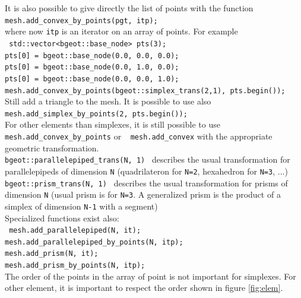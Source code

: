 \documentclass[11pt,a4paper]{article}
\begin{document}
It is also possible to give directly the list of points with the function\\[0.5cm]
{\tt mesh.add\_convex\_by\_points(pgt, itp); }\\[0.5cm]
where now {\tt itp} is an iterator on an array of points. For example\\[0.5cm]
{\tt
  std::vector<bgeot::base\_node> pts(3); \\
  pts[0] = bgeot::base\_node(0.0, 0.0, 0.0); \\
  pts[0] = bgeot::base\_node(0.0, 1.0, 0.0); \\
  pts[0] = bgeot::base\_node(0.0, 0.0, 1.0); \\
  mesh.add\_convex\_by\_points(bgeot::simplex\_trans(2,1), pts.begin());
}\\[0.5cm]
Still add a triangle to the mesh.
It is possible to use also \\[0.5cm]
{\tt mesh.add\_simplex\_by\_points(2, pts.begin()); } \\[0.5cm]

For other elements than simplexes, it is still possible to use {\tt mesh.add\_convex\_by\_points} or $\ $$\ $ {\tt mesh.add\_convex} with the appropriate geometric transformation. \\[0.5cm]
{\tt bgeot::parallelepiped\_trans(N, 1) }
describes the usual transformation for parallelepipeds of dimension {\tt N} (quadrilateron for {\tt N=2}, hexahedron for {\tt N=3}, ...) \\[0.5cm]
{\tt bgeot::prism\_trans(N, 1) } 
describes the usual transformation for prisms of dimension {\tt N} (usual prism is for {\tt N=3}. A generalized prism is the product of a simplex of dimension {\tt N-1} with a segment) \\[0.5cm]
Specialized functions exist also: \\[0.5cm]
{\tt 
  mesh.add\_parallelepiped(N, it); \\
  mesh.add\_parallelepiped\_by\_points(N, itp); \\
  mesh.add\_prism(N, it); \\
  mesh.add\_prism\_by\_points(N, itp);
} \\[0.5cm]

The order of the points in the array of point is not important for simplexes. For other element, it is important to respect the order shown in figure \ref{fig:elem}.
\end{document}
